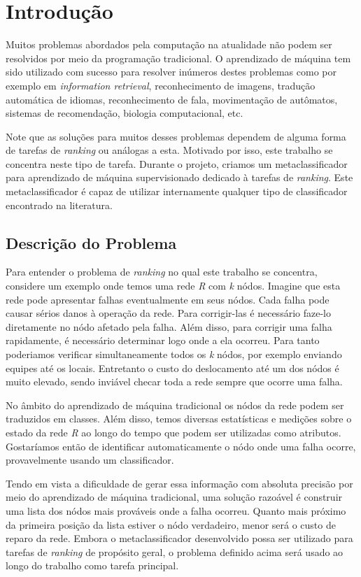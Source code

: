 \chapter{Introdução}

Muitos problemas abordados pela computação na atualidade não podem ser resolvidos por meio da programação tradicional.
O aprendizado de máquina tem sido utilizado com sucesso para resolver inúmeros destes problemas como por exemplo em \textit{information retrieval}, reconhecimento de imagens, tradução automática de idiomas, reconhecimento de fala, movimentação de autômatos, sistemas de recomendação, biologia computacional, etc.

Note que as soluções para muitos desses problemas dependem de alguma forma de tarefas de \textit{ranking} ou análogas a esta.
Motivado por isso, este trabalho se concentra neste tipo de tarefa.
Durante o projeto, criamos um metaclassificador para aprendizado de máquina supervisionado dedicado à tarefas de \textit{ranking}.
Este metaclassificador é capaz de utilizar internamente qualquer tipo de classificador encontrado na literatura.

\section{Descrição do Problema}

Para entender o problema de \textit{ranking} no qual este trabalho se concentra, considere um exemplo onde temos uma rede \textit{R} com \textit{k} nódos.
Imagine que esta rede pode apresentar falhas eventualmente em seus nódos.
Cada falha pode causar sérios danos à operação da rede.
Para corrigir-las é necessário faze-lo diretamente no nódo afetado pela falha.
Além disso, para corrigir uma falha rapidamente, é necessário determinar logo onde a ela ocorreu.
Para tanto poderiamos verificar simultaneamente todos os \textit{k} nódos, por exemplo enviando equipes até os locais.
Entretanto o custo do deslocamento até um dos nódos é muito elevado, sendo inviável checar toda a rede sempre que ocorre uma falha.

No âmbito do aprendizado de máquina tradicional os nódos da rede podem ser traduzidos em classes.
Além disso, temos diversas estatísticas e medições sobre o estado da rede \textit{R} ao longo do tempo que podem ser utilizadas como atributos.
Gostaríamos então de identificar automaticamente o nódo onde uma falha ocorre, provavelmente usando um classificador.

Tendo em vista a dificuldade de gerar essa informação com absoluta precisão por meio do aprendizado de máquina tradicional, uma solução razoável é construir uma lista dos nódos mais prováveis onde a falha ocorreu.
Quanto mais próximo da primeira posição da lista estiver o nódo verdadeiro, menor será o custo de reparo da rede.
Embora o metaclassificador desenvolvido possa ser utilizado para tarefas de \textit{ranking} de propósito geral, o problema definido acima será usado ao longo do trabalho como tarefa principal.

